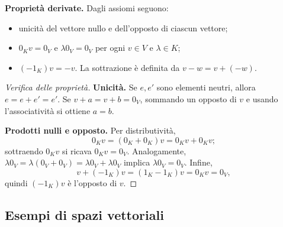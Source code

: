\textbf{Proprietà derivate.} Dagli assiomi seguono:
\begin{itemize}
  \item unicità del vettore nullo e dell'opposto di ciascun vettore;
  \item $0_Kv=0_V$ e $\lambda0_V=0_V$ per ogni $v\in V$ e $\lambda\in K$;
  \item $(-1_K)v=-v$. La sottrazione è definita da $v-w=v+(-w)$.
\end{itemize}
\begin{proof}[Verifica delle proprietà]
\textbf{Unicità.} Se $e,e'$ sono elementi neutri, allora $e=e+e'=e'$. Se $v+a=v+b=0_V$, sommando un opposto di $v$ e usando l'associatività si ottiene $a=b$.

\textbf{Prodotti nulli e opposto.} Per distributività,
\[
  0_Kv=(0_K+0_K)v=0_Kv+0_Kv;
\]
sottraendo $0_Kv$ si ricava $0_Kv=0_V$. Analogamente, $\lambda0_V=\lambda(0_V+0_V)=\lambda0_V+\lambda0_V$ implica $\lambda0_V=0_V$. Infine,
\[
  v+(-1_K)v=(1_K-1_K)v=0_Kv=0_V,
\]
quindi $(-1_K)v$ è l'opposto di $v$.
\end{proof}

\subsection{Esempi di spazi vettoriali}

